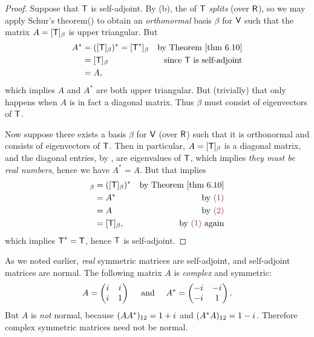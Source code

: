 \begin{proof}
Suppose that \(\textsf{T}\) is self-adjoint.
By (b), the \CPOLY{} of \(\textsf{T}\) \emph{splits} (over \(\textsf{R}\)),
so we may apply Schur's theorem() to obtain an \emph{orthonormal} basis \(\beta\) for \(\textsf{V}\) such that the matrix \(A = [\textsf{T}]_{\beta}\) is upper triangular.
But
\begin{align*}
    A^* & = ([\T]_{\beta})^* = [\T^*]_{\beta} & \text{by \THM{6.10}} \\
        & = [\T]_{\beta} & \text{since \(\T\) is self-adjoint} \\
        & = A,
\end{align*}
which implies \(A\) and \(A^*\) are both upper triangular.
But (trivially) that only happens when \(A\) is in fact a diagonal matrix.
Thus \(\beta\) must consist of eigenvectors of \(\textsf{T}\).

Now suppose there exists a basis \(\beta\) for \(\textsf{V}\) (over \(\textsf{R}\)) such that it is orthonormal and consists of eigenvectors of \(\textsf{T}\).
Then in particular, \(A = [\textsf{T}]_{\beta}\)  is a diagonal matrix, and the diagonal entries, by , are eigenvalues of \(\textsf{T}\), which implies \emph{they must be real numbers}, hence we have \(A^* = A\). 
But that implies
\begin{align*}
    [\T^*]_{\beta} & = ([\T]_{\beta})^* & \text{by \THM{6.10}} \\
        & = A^* & \text{by \MAROON{(1)}} \\
        & = A & \text{by \MAROON{(2)}} \\
        & = [\T]_{\beta}, & \text{by \MAROON{(1)} again}
\end{align*}
which implies \(\textsf{T}^* = \textsf{T}\), hence \(\textsf{T}\) is self-adjoint.
\end{proof}

\begin{example} \label{example 6.4.4}
As we noted earlier, \emph{real} symmetric matrices are self-adjoint, and self-adjoint matrices are normal.
The following matrix \(A\) is \emph{complex} and symmetric:
\[
    A = \begin{pmatrix} {i\mkern1mu} & {i\mkern1mu} \\ {i\mkern1mu} & 1 \end{pmatrix} \quad \text{ and } \quad A^* = \begin{pmatrix} -{i\mkern1mu} & -{i\mkern1mu} \\ -{i\mkern1mu} & 1 \end{pmatrix}.
\]
But \(A\) is \emph{not} normal, because \((AA^*)_{12} = 1 + {i\mkern1mu}\) and \((A^*A)_{12} = 1 - {i\mkern1mu}\).
Therefore complex symmetric matrices need not be normal.
\end{example}
